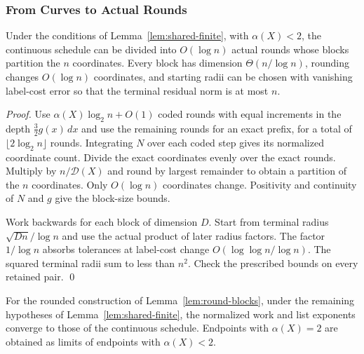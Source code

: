 \documentclass[runningheads,envcountsame,envcountsect,orivec]{llncs}
\begin{document}
\subsubsection{From Curves to Actual Rounds}

\begin{lemma}
\label{lem:round-blocks}
Under the conditions of Lemma~\ref{lem:shared-finite},
with $\alpha(X)<2$, the continuous schedule can be divided
into $O(\log n)$ actual rounds whose blocks partition
the $n$ coordinates. Every block has dimension
$\Theta(n/\log n)$, rounding changes $O(\log n)$ coordinates,
and starting radii can be chosen with vanishing label-cost
error so that the terminal residual norm is at most $n$.
\end{lemma}

\begin{proof}
Use $\alpha(X)\log_2 n+O(1)$ coded rounds with equal
increments in the depth $\tfrac32g(x)\,dx$ and use the
remaining rounds for an exact prefix, for a total of
$\lfloor2\log_2 n\rfloor$ rounds. Integrating $N$ over
each coded step gives its normalized coordinate count.
Divide the exact coordinates evenly over the exact rounds.
Multiply by $n/\mathcal D(X)$ and round by largest remainder
to obtain a partition of the $n$ coordinates. Only
$O(\log n)$ coordinates change. Positivity and continuity
of $N$ and $g$ give the block-size bounds.

Work backwards for each block of dimension $D$.
Start from terminal radius $\sqrt{Dn}/\log n$ and use the
actual product of later radius factors. The factor $1/\log n$
absorbs tolerances at label-cost change $O(\log\log n/\log n)$.
The squared terminal radii sum to less than $n^2$.
Check the prescribed bounds on every retained pair.
\qed
\end{proof}

\begin{lemma}
\label{lem:round-costs}
For the rounded construction of Lemma~\ref{lem:round-blocks},
under the remaining hypotheses of Lemma~\ref{lem:shared-finite},
the normalized work and list exponents converge to those of
the continuous schedule. Endpoints with $\alpha(X)=2$ are
obtained as limits of endpoints with $\alpha(X)<2$.
\end{lemma}
\end{document}
